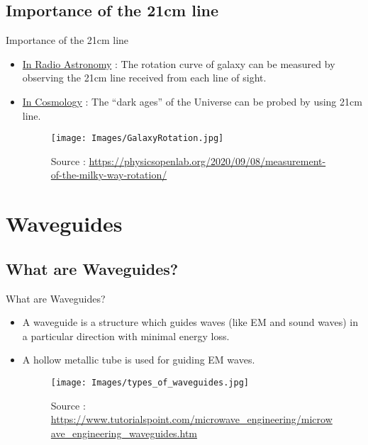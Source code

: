 \documentclass[12pt, dvipsnames]{beamer}
\begin{document}
\subsection{Importance of the 21cm line}
\begin{frame}{Importance of the 21cm line}
    \begin{itemize} 
        \item \uline{In Radio Astronomy} : The rotation curve of galaxy can be measured by observing the 21cm line received from each line of sight.
        \item \uline{In Cosmology} : The ``dark ages'' of the Universe can be probed by using 21cm line.
        \begin{figure}
            \centering
            \texttt{[image: Images/GalaxyRotation.jpg]}
            \caption{\tiny Source : \url{https://physicsopenlab.org/2020/09/08/measurement-of-the-milky-way-rotation/}}
        \end{figure}
    \end{itemize}
\end{frame}

% 
\section{Waveguides}
\subsection{What are Waveguides?}
\begin{frame}{What are Waveguides?}
    \begin{itemize}
        \item A waveguide is a structure which guides waves (like EM and sound waves) in a particular direction with minimal energy loss.
        \item A hollow metallic tube is used for guiding EM waves.
        \begin{figure}
            \centering
            \texttt{[image: Images/types\_of\_waveguides.jpg]}
            \caption{\tiny Source : \url{https://www.tutorialspoint.com/microwave_engineering/microwave_engineering_waveguides.htm}}
        \end{figure}
    \end{itemize}
\end{frame}
\end{document}

